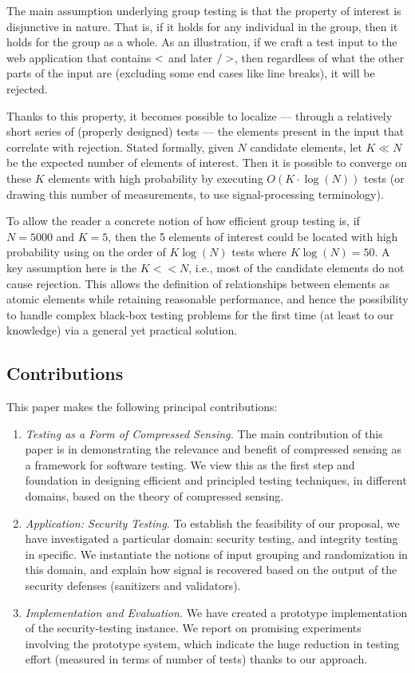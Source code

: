 The main assumption underlying group testing is that the property of interest is disjunctive in nature. That is, if it holds for any individual in the group, then it holds for the group as a whole. As an illustration, if we craft a test input to the web application that contains ${\sf <}$ and later ${\sf />}$, then regardless of what the other parts of the input are (excluding some end cases like line breaks), it will be rejected.

Thanks to this property, it becomes possible to localize --- through a relatively short series of (properly designed) tests --- the elements present in the input that correlate with rejection. Stated formally, given $N$ candidate elements, let $K \ll N$ be the expected number of elements of interest. Then it is possible to converge on these $K$ elements with high probability by executing $O(K \cdot \log (N))$ tests (or drawing this number of measurements, to use signal-processing terminology).

To allow the reader a concrete notion of how efficient group testing is, if $N=5000$ and $K=5$, then the 5 elements of interest could be located with high probability using on the order of $K\log(N)$ tests where $K\log(N)=50$. A key assumption here is the $K<<N$, i.e., most of the candidate elements do not cause rejection. This allows the definition of relationships between elements as atomic elements while retaining reasonable performance, and hence the possibility to handle complex black-box testing problems for the first time (at least to our knowledge) via a general yet practical solution.

\subsection{Contributions}

This paper makes the following principal contributions:
\begin{enumerate}
	\item \emph{Testing as a Form of Compressed Sensing.} The main contribution of this paper is in demonstrating the relevance and benefit of compressed sensing as a framework for software testing. We view this as the first step and foundation in designing efficient and principled testing techniques, in different domains, based on the theory of compressed sensing.
	\item \emph{Application: Security Testing.} To establish the feasibility of our proposal, we have investigated a particular domain: security testing, and integrity testing in specific. We instantiate the notions of input grouping and randomization in this domain, and explain how signal is recovered based on the output of the security defenses (sanitizers and validators).
	\item \emph{Implementation and Evaluation.} We have created a prototype implementation of the security-testing instance. We report on promising experiments involving the prototype system, which indicate the huge reduction in testing effort (measured in terms of number of tests) thanks to our approach.
\end{enumerate}